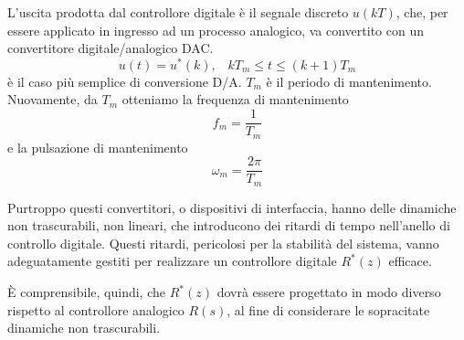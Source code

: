 \documentclass[a4paper]{report}
\begin{document}
L'uscita prodotta dal controllore digitale \`e il segnale discreto
$u(kT)$, che, per essere applicato in ingresso ad un processo
analogico, va convertito con un convertitore digitale/analogico DAC.
\[
u(t) = u^{*}(k), \;\;\; kT_m \leq t \leq (k + 1)T_m
\]
\`e il caso pi\`u semplice di conversione D/A. $T_m$ \`e il periodo di
mantenimento. Nuovamente, da $T_m$
otteniamo la frequenza di mantenimento
\[
f_m = \dfrac{1}{T_m}
\]
e la pulsazione di mantenimento
\[
\omega_m = \dfrac{2 \pi}{T_m}
\]

Purtroppo questi convertitori, o dispositivi di interfaccia, hanno
delle dinamiche non trascurabili, non lineari, che introducono dei
ritardi di tempo nell'anello di controllo digitale. Questi ritardi,
pericolosi per la stabilit\`a del sistema, vanno adeguatamente gestiti
per realizzare un controllore digitale $R^*(z)$ efficace.

\`E comprensibile, quindi, che $R^*(z)$ dovr\`a essere progettato in
modo diverso rispetto al controllore analogico $R(s)$, al fine di
considerare le sopracitate dinamiche non trascurabili.
\end{document}
